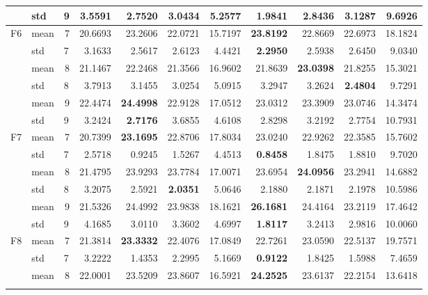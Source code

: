 \documentclass[conference]{IEEEtran}
\begin{document}
\begin{table}[]
\begin{tabular}{|c|l|l|r|r|r|r|r|r|r|r|}
 & std & 9 & 3.5591 & 2.7520 & 3.0434 & 5.2577 & \textbf{1.9841} & 2.8436 & 3.1287 & 9.6926 \\ \hline
\multirow{6}{*}{F6} & mean & \multicolumn{1}{r|}{7} & 20.6693 & 23.2606 & 22.0721 & 15.7197 & \textbf{23.8192} & 22.8669 & 22.6973 & 18.1824 \\ \cline{2-11} 
 & std & 7 & 3.1633 & 2.5617 & 2.6123 & 4.4421 & \textbf{2.2950} & 2.5938 & 2.6450 & 9.0340 \\ \cline{2-11} 
 & mean & \multicolumn{1}{r|}{8} & 21.1467 & 22.2468 & 21.3566 & 16.9602 & 21.8639 & \textbf{23.0398} & 21.8255 & 15.3021 \\ \cline{2-11} 
 & std & 8 & 3.7913 & 3.1455 & 3.0254 & 5.0915 & 3.2947 & 3.2624 & \textbf{2.4804} & 9.7291 \\ \cline{2-11} 
 & mean & \multicolumn{1}{r|}{9} & 22.4474 & \textbf{24.4998} & 22.9128 & 17.0512 & 23.0312 & 23.3909 & 23.0746 & 14.3474 \\ \cline{2-11} 
 & std & 9 & 3.2424 & \textbf{2.7176} & 3.6855 & 4.6108 & 2.8298 & 3.2192 & 2.7754 & 10.7931 \\ \hline
\multirow{6}{*}{F7} & mean & \multicolumn{1}{r|}{7} & 20.7399 & \textbf{23.1695} & 22.8706 & 17.8034 & 23.0240 & 22.9262 & 22.3585 & 15.7602 \\ \cline{2-11} 
 & std & 7 & 2.5718 & 0.9245 & 1.5267 & 4.4513 & \textbf{0.8458} & 1.8475 & 1.8810 & 9.7020 \\ \cline{2-11} 
 & mean & \multicolumn{1}{r|}{8} & 21.4795 & 23.9293 & 23.7784 & 17.0071 & 23.6954 & \textbf{24.0956} & 23.2941 & 14.6882 \\ \cline{2-11} 
 & std & 8 & 3.2075 & 2.5921 & \textbf{2.0351} & 5.0646 & 2.1880 & 2.1871 & 2.1978 & 10.5986 \\ \cline{2-11} 
 & mean & \multicolumn{1}{r|}{9} & 21.5326 & 24.4992 & 23.9838 & 18.1621 & \textbf{26.1681} & 24.4164 & 23.2119 & 17.4642 \\ \cline{2-11} 
 & std & 9 & 4.1685 & 3.0110 & 3.3602 & 4.6997 & \textbf{1.8117} & 3.2413 & 2.9816 & 10.0060 \\ \hline
\multirow{6}{*}{F8} & mean & \multicolumn{1}{r|}{7} & 21.3814 & \textbf{23.3332} & 22.4076 & 17.0849 & 22.7261 & 23.0590 & 22.5137 & 19.7571 \\ \cline{2-11} 
 & std & 7 & 3.2222 & 1.4353 & 2.2995 & 5.1669 & \textbf{0.9122} & 1.8425 & 1.5988 & 7.4659 \\ \cline{2-11} 
 & mean & \multicolumn{1}{r|}{8} & 22.0001 & 23.5209 & 23.8607 & 16.5921 & \textbf{24.2525} & 23.6137 & 22.2154 & 13.6418 \\ \cline{2-11} 

\end{tabular}
\end{table}
\end{document}
